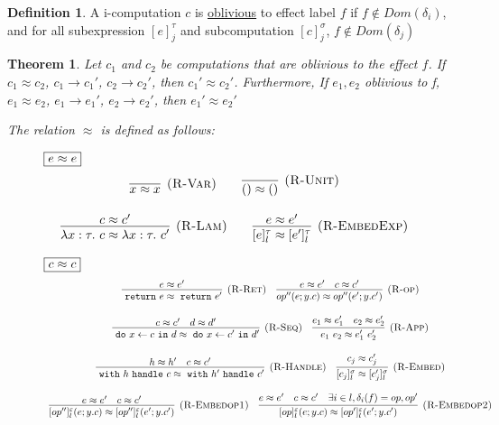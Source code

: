 \documentclass{article}
\newtheorem{theorem}{Theorem}[section]
\theoremstyle{definition}
\newtheorem{definition}{Definition}[section]
\newcommand{\m}[1]{\ \texttt{#1}\ }
\begin{document}
\begin{definition}
A i-computation $c$ is \underline{oblivious} to effect label $f$ if $f \not\in Dom(\delta_i)$, and for all subexpression $[e]^\tau_j$ and subcomputation $[c]^\sigma_j$, $f \not\in Dom(\delta_j)$
\end{definition}


\begin{theorem} 

Let $c_1$ and $c_2$ be computations that are oblivious to the effect $f$.  If $c_1 \approx c_2$, $c_1 \rightarrow c_1'$, $c_2 \rightarrow c_2'$, then $c_1' \approx c_2'$. Furthermore,  If $e_1, e_2$ oblivious to f, $e_1 \approx e_2$, $e_1 \rightarrow e_1'$, $e_2 \rightarrow e_2'$, then $e_1' \approx e_2'$

The relation $\approx$ is defined as follows:
\begin{figure}[H]
\flushleft
\footnotesize{

$\fbox{$e \approx e$}$
\[
\begin{array}{c}
\infer[\textsc{(R-Var)}]{x \approx x}
{} \qquad \infer[\textsc{(R-Unit)}]{() \approx ()}{} \\[3ex]
\infer[\textsc{(R-Lam)}]{\lambda x:\tau.\ c \approx \lambda x:\tau.\ c'}{c \approx c'} \qquad
\infer[\textsc{(R-EmbedExp)}]{[e]^\tau_l \approx [e']^\tau_l}{e \approx e'}
\end{array}
\]


$\fbox{$c \approx c$}$
\[
\begin{array}{c}
\infer[\textsc{(R-Ret)}]
  {\m{return} e \approx \m{return} e'}
  {e \approx e'}  
  \quad 
\infer[\textsc{(R-op)}]
  {op''(e; y.c) \approx op''(e'; y.c')}
  {e \approx e' & c \approx c'}
  \\[3ex]
\infer[\textsc{(R-Seq)}]
  {\m{do} x \leftarrow c \m{in} d \approx \m{do} x \leftarrow c' \m{in} d'}
  {c \approx c' & d  \approx d'} \quad
\infer[\textsc{(R-App)}]
  {e_1\ e_2 \approx e_1'\ e_2'}
  {e_1 \approx e_1' & e_2 \approx e_2'} \\[3ex]
\infer[\textsc{(R-Handle)}]
  {\m{with} h \m{handle} c \approx \m{with} h' \m{handle} c'}
  {h \approx h' & c \approx c'} \quad 
\infer[\textsc{(R-Embed)}]
  {[c_j]^\sigma_l \approx [c_j']^\sigma_l}
  {c_j \approx c_j'} \\[3ex]

\infer[\textsc{(R-Embedop1)}]
  {[op'']^\varepsilon_l(e; y.c) \approx [op'']^\varepsilon_l(e'; y.c')}
  {e \approx e' & c \approx c'}
  \quad
\infer[\textsc{(R-Embedop2)}]
  {[op]^\varepsilon_l(e; y.c) \approx [op']^\varepsilon_l(e'; y.c')}
  {e \approx e' & c \approx c' & \exists i \in l, \delta_i(f) = op, op'} \\[3ex]
\end{array}
\]

}
\end{figure}
\end{theorem}
\end{document}
